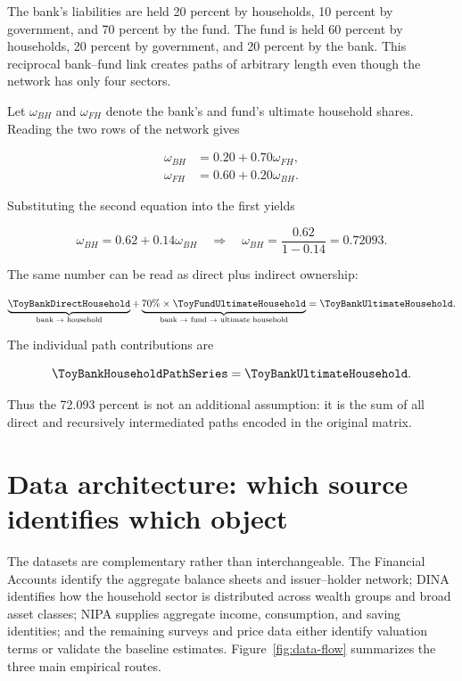\documentclass[11pt]{article}
\begin{document}
The bank's liabilities are held 20 percent by households, 10 percent by
government, and 70 percent by the fund. The fund is held 60 percent by
households, 20 percent by government, and 20 percent by the bank. This
reciprocal bank--fund link creates paths of arbitrary length even though the
network has only four sectors.

Let $\omega_{BH}$ and $\omega_{FH}$ denote the bank's and fund's ultimate
household shares. Reading the two rows of the network gives

\begin{align}
  \omega_{BH} & =0.20+0.70\omega_{FH}, \\
  \omega_{FH} & =0.60+0.20\omega_{BH}.
\end{align}

Substituting the second equation into the first yields

\begin{equation}
  \omega_{BH}=0.62+0.14\omega_{BH}
  \quad\Longrightarrow\quad
  \omega_{BH}=\frac{0.62}{1-0.14}=0.72093.
\end{equation}

The same number can be read as direct plus indirect ownership:

\begin{equation}
  \underbrace{\ToyBankDirectHousehold}_{\text{bank $\to$ household}}
  +
  \underbrace{70\%\times\ToyFundUltimateHousehold}_{
  \text{bank $\to$ fund $\to$ ultimate household}}
  =\ToyBankUltimateHousehold.
\end{equation}

The individual path contributions are

\begin{equation}
  \ToyBankHouseholdPathSeries=\ToyBankUltimateHousehold.
\end{equation}

Thus the 72.093 percent is not an additional assumption: it is the sum of all
direct and recursively intermediated paths encoded in the original matrix.

\section{Data architecture: which source identifies which object}
\label{sec:data-architecture}

The datasets are complementary rather than interchangeable.  The Financial
Accounts identify the aggregate balance sheets and issuer--holder network;
DINA identifies how the household sector is distributed across wealth groups
and broad asset classes; NIPA supplies aggregate income, consumption, and
saving identities; and the remaining surveys and price data either identify
valuation terms or validate the baseline estimates.  Figure~\ref{fig:data-flow}
summarizes the three main empirical routes.
\end{document}

